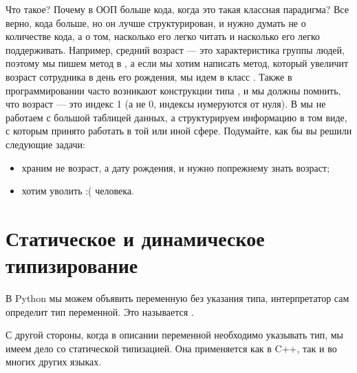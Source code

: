 \documentclass[letterpaper,10pt,russian]{sphinxmanual}
\begin{document}
\sphinxAtStartPar
Что такое? Почему в ООП больше кода, когда это такая классная парадигма? Все верно, кода больше, но он лучше структурирован, и нужно думать не о количестве кода, а о том, насколько его легко читать и насколько его легко поддерживать. Например, средний возраст — это характеристика группы людей, поэтому мы пишем метод в , а если мы хотим написать метод, который увеличит возраст сотрудника в день его рождения, мы идем в класс . Также в  программировании часто возникают конструкции типа , и мы должны помнить, что возраст — это индекс 1 (а не 0, индексы нумеруются от нуля). В  мы не работаем с большой таблицей данных, а структурируем информацию в том виде, с которым принято работать в той или иной сфере. Подумайте, как бы вы решили следующие задачи:
\begin{itemize}
\item {} 
\sphinxAtStartPar
храним не возраст, а дату рождения, и нужно по\sphinxhyphen{}прежнему знать возраст;

\item {} 
\sphinxAtStartPar
хотим уволить :( человека.

\end{itemize}


\section{Статическое и динамическое типизирование}
\label{\detokenize{educational_materials/terms/content:id3}}
\sphinxAtStartPar
В Python мы можем объявить переменную без указания типа, интерпретатор сам определит тип переменной. Это называется .

\begin{sphinxVerbatim}[commandchars=\\\{\}]
   
      
\end{sphinxVerbatim}

\sphinxAtStartPar
С другой стороны, когда в описании переменной необходимо указывать тип, мы имеем дело со статической типизацией. Она применяется как в C++, так и во многих других языках.
\end{document}
